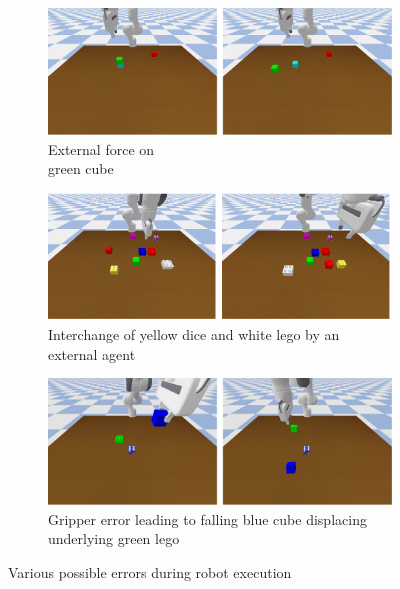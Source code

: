 \begin{figure}
    \centering
    \begin{subfigure}{.45\textwidth}
        \centering
        \includegraphics[width=\textwidth]{assets/error-force.png}
        \caption{External force on \\green cube}
    \end{subfigure}
    \hfill
    \begin{subfigure}{.45\textwidth}
        \centering
        \includegraphics[width=\textwidth]{assets/error-interchange.png}
        \caption{Interchange of yellow dice and white lego by an external agent}
    \end{subfigure}

    \vspace{1cm}

    \begin{subfigure}{.45\textwidth}
        \centering
        \includegraphics[width=\textwidth]{assets/error-gripper.png}
        \caption{Gripper error leading to falling blue cube displacing underlying green lego}
    \end{subfigure}
    
    \caption{Various possible errors during robot execution}
    \label{fig:errors-possible}
\end{figure}


